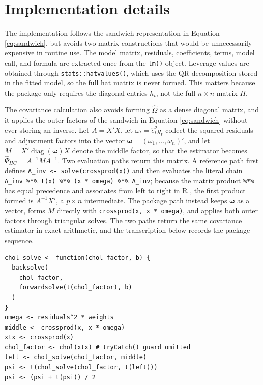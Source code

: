 \section{Implementation details}\label{implementation-details}

The implementation follows the sandwich representation in Equation \eqref{eq:sandwich}, but avoids two matrix constructions that would be unnecessarily expensive in routine use. The model matrix, residuals, coefficients, terms, model call, and formula are extracted once from the \texttt{lm()} object. Leverage values are obtained through \texttt{stats::hatvalues()}, which uses the QR decomposition stored in the fitted model, so the full hat matrix is never formed. This matters because the package only requires the diagonal entries \(h_t\), not the full \(n \times n\) matrix \(H\).

The covariance calculation also avoids forming \(\widehat{\Omega}\) as a dense diagonal matrix, and it applies the outer factors of the sandwich in Equation \eqref{eq:sandwich} without ever storing an inverse. Let \(A = X'X\), let \(\omega_t = \hat{e}_t^2 g_t\) collect the squared residuals and adjustment factors into the vector \(\boldsymbol{\omega} = (\omega_1, \ldots, \omega_n)'\), and let \(M = X'\operatorname{diag}(\boldsymbol{\omega})X\) denote the middle factor, so that the estimator becomes \(\widehat{\Psi}_{HC} = A^{-1} M A^{-1}\). Two evaluation paths return this matrix. A reference path first defines \texttt{A\_inv\ \textless{}-\ solve(crossprod(x))} and then evaluates the literal chain \texttt{A\_inv\ \%*\%\ t(x)\ \%*\%\ (x\ *\ omega)\ \%*\%\ A\_inv}; because the matrix product \texttt{\%*\%} has equal precedence and associates from left to right in R \citep{RCoreTeam2026}, the first product formed is \(A^{-1}X'\), a \(p \times n\) intermediate. The package path instead keeps \(\boldsymbol{\omega}\) as a vector, forms \(M\) directly with \texttt{crossprod(x,\ x\ *\ omega)}, and applies both outer factors through triangular solves. The two paths return the same covariance estimator in exact arithmetic, and the transcription below records the package sequence.

\begin{verbatim}
chol_solve <- function(chol_factor, b) {
  backsolve(
    chol_factor,
    forwardsolve(t(chol_factor), b)
  )
}
omega <- residuals^2 * weights
middle <- crossprod(x, x * omega)
xtx <- crossprod(x)
chol_factor <- chol(xtx) # tryCatch() guard omitted
left <- chol_solve(chol_factor, middle)
psi <- t(chol_solve(chol_factor, t(left)))
psi <- (psi + t(psi)) / 2
\end{verbatim}

